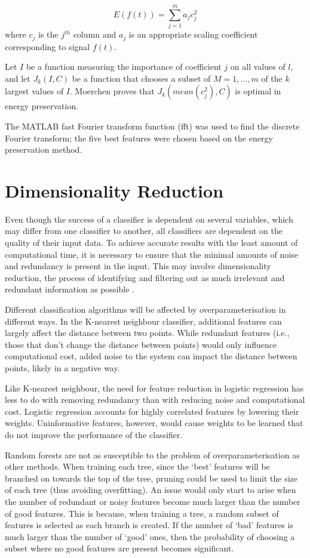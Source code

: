 \[E(f(t))=\sum_{j=1}^ma_jc^2_j\] 
where $c_j$ is the $j^{th}$ column and $a_j$ is an appropriate scaling coefficient corresponding to signal $f(t)$. 

Let $I$ be a function measuring the importance of coefficient $j$ on all values of $l$, and let $J_k(I,C)$ be a function that chooses a subset of $M = {1, ..., m}$ of the $k$ largest values of $I$. Moerchen \cite{Moerchen} proves that $J_k(mean(c_j^2),C)$ is optimal in energy preservation.

The MATLAB fast Fourier transform function (fft) was used to find the discrete Fourier transform; the five best features were chosen based on the energy preservation method.


		
\section{Dimensionality Reduction}
\label{sec:dimensionalityReduction}

Even though the success of a classifier is dependent on several variables, which may differ from one classifier to another, all classifiers are dependent on the quality of their input data. To achieve accurate results with the least amount of computational time, it is necessary to ensure that the minimal amounts of noise and redundancy is present in the input. This may involve dimensionality reduction, the process of identifying and filtering out as much irrelevant and redundant information as possible \cite{Hall}. 

Different classification algorithms will be affected by overparameterisation in different ways. In the K-nearest neighbour classifier, additional features can largely affect the distance between two points. While redundant features (i.e., those that don't change the distance between points) would only influence computational cost, added noise to the system can impact the distance between points, likely in a negative way. 

Like K-nearest neighbour, the need for feature reduction in logistic regression has less to do with removing redundancy than with reducing noise and computational cost. Logistic regression accounts for highly correlated features by lowering their weights. Uninformative features, however, would cause weights to be learned that do not improve the performance of the classifier. 

Random forests are not as susceptible to the problem of overparameterisation as other methods. When training each tree, since the `best' features will be branched on towards the top of the tree, pruning could be used to limit the size of each tree (thus avoiding overfitting). An issue would only start to arise when the number of redundant or noisy features become much larger than the number of good features. This is because, when training a tree, a random subset of features is selected as each branch is created. If the number of `bad' features is much larger than the number of `good' ones, then the probability of choosing a subset where no good features are present becomes significant.

